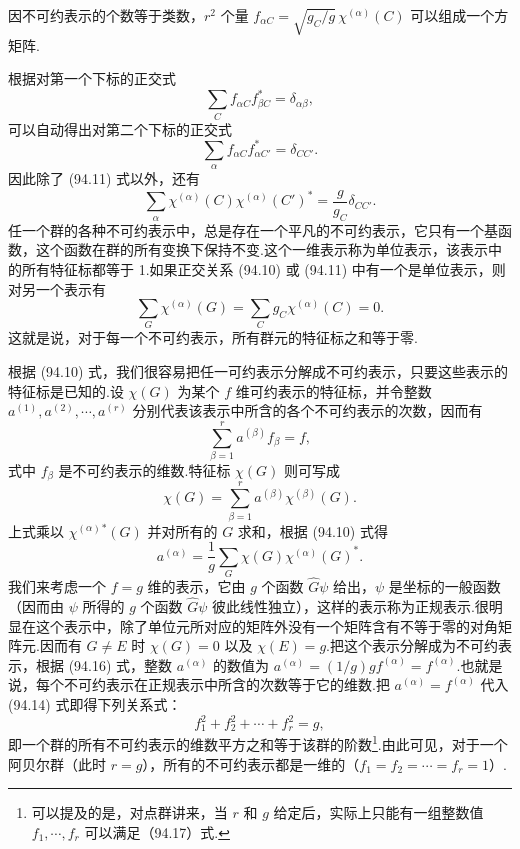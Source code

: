 因不可约表示的个数等于类数，$r^2$ 个量 $f_{\alpha C}=\sqrt{g_C/g}\,\chi^{(\alpha)}(C)$ 可以组成一个方矩阵.

根据对第一个下标的正交式
\begin{equation*}
  \sum_C f_{\alpha C}f_{\beta C}^{*}=\delta_{\alpha\beta},
\end{equation*}
可以自动得出对第二个下标的正交式
\begin{equation*}
  \sum_\alpha f_{\alpha C}f_{\alpha C'}^{*}=\delta_{CC'}.
\end{equation*}
因此除了 (94.11) 式以外，还有
\begin{equation}
  \sum_\alpha\chi^{(\alpha)}(C)\chi^{(\alpha)}(C')^{*}
  =\frac{g}{g_C}\delta_{CC'}.
\end{equation}
任一个群的各种不可约表示中，总是存在一个平凡的不可约表示，它只有一个基函数，这个函数在群的所有变换下保持不变.这个一维表示称为单位表示，该表示中的所有特征标都等于 1.如果正交关系 (94.10) 或 (94.11) 中有一个是单位表示，则对另一个表示有
\begin{equation}
  \sum_G\chi^{(\alpha)}(G)=\sum_C g_C\chi^{(\alpha)}(C)=0.
\end{equation}
这就是说，对于每一个不可约表示，所有群元的特征标之和等于零.

根据 (94.10) 式，我们很容易把任一可约表示分解成不可约表示，只要这些表示的特征标是已知的.设 $\chi(G)$ 为某个 $f$ 维可约表示的特征标，并令整数 $a^{(1)},a^{(2)},\cdots,a^{(r)}$ 分别代表该表示中所含的各个不可约表示的次数，因而有
\begin{equation}
  \sum_{\beta=1}^{r}a^{(\beta)}f_\beta=f,
\end{equation}
式中 $f_\beta$ 是不可约表示的维数.特征标 $\chi(G)$ 则可写成
\begin{equation}
  \chi(G)=\sum_{\beta=1}^{r}a^{(\beta)}\chi^{(\beta)}(G).
\end{equation}
上式乘以 $\chi^{(\alpha)}{}^{*}(G)$ 并对所有的 $G$ 求和，根据 (94.10) 式得
\begin{equation}
  a^{(\alpha)}=\frac{1}{g}\sum_G\chi(G)\chi^{(\alpha)}(G)^{*}.
\end{equation}
我们来考虑一个 $f=g$ 维的表示，它由 $g$ 个函数 $\hat{G}\psi$ 给出，$\psi$ 是坐标的一般函数（因而由 $\psi$ 所得的 $g$ 个函数 $\hat{G}\psi$ 彼此线性独立），这样的表示称为正规表示.很明显在这个表示中，除了单位元所对应的矩阵外没有一个矩阵含有不等于零的对角矩阵元.因而有 $G\neq E$ 时 $\chi(G)=0$ 以及 $\chi(E)=g$.把这个表示分解成为不可约表示，根据 (94.16) 式，整数 $a^{(\alpha)}$ 的数值为 $a^{(\alpha)}=(1/g)gf^{(\alpha)}=f^{(\alpha)}$.也就是说，每个不可约表示在正规表示中所含的次数等于它的维数.把 $a^{(\alpha)}=f^{(\alpha)}$ 代入 (94.14) 式即得下列关系式：
\begin{equation}
  f_1^2+f_2^2+\cdots+f_r^2=g,
\end{equation}
即一个群的所有不可约表示的维数平方之和等于该群的阶数\footnote{可以提及的是，对点群讲来，当 $r$ 和 $g$ 给定后，实际上只能有一组整数值 $f_1,\cdots,f_r$ 可以满足（94.17）式.}.由此可见，对于一个阿贝尔群（此时 $r=g$），所有的不可约表示都是一维的（$f_1=f_2=\cdots=f_r=1$）.

